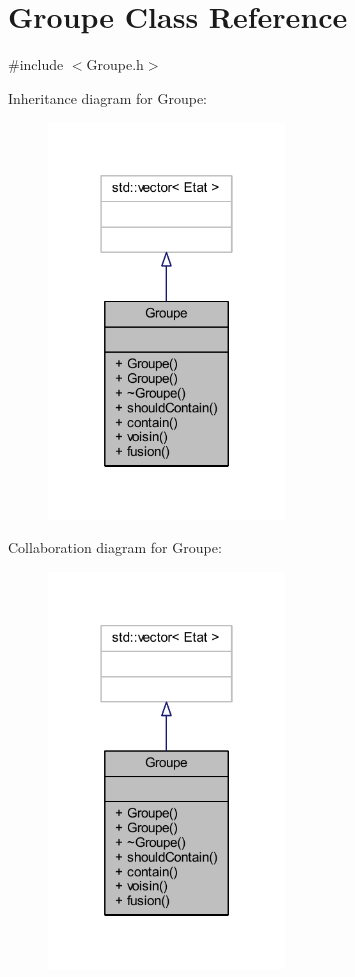 \hypertarget{class_groupe}{}\section{Groupe Class Reference}
\label{class_groupe}


{\ttfamily \#include $<$Groupe.\+h$>$}



Inheritance diagram for Groupe\+:\nopagebreak
\begin{figure}[H]
\begin{center}
\leavevmode
\includegraphics[width=178pt]{class_groupe__inherit__graph}
\end{center}
\end{figure}


Collaboration diagram for Groupe\+:\nopagebreak
\begin{figure}[H]
\begin{center}
\leavevmode
\includegraphics[width=178pt]{class_groupe__coll__graph}
\end{center}
\end{figure}
